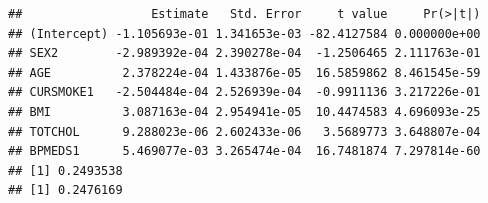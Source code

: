 \documentclass[ignorenonframetext,]{beamer}
\newenvironment{Shaded}{\begin{snugshade}}{\end{snugshade}}
\newcommand{\KeywordTok}[1]{\textcolor[rgb]{0.13,0.29,0.53}{\textbf{#1}}}
\newcommand{\DataTypeTok}[1]{\textcolor[rgb]{0.13,0.29,0.53}{#1}}
\newcommand{\DecValTok}[1]{\textcolor[rgb]{0.00,0.00,0.81}{#1}}
\newcommand{\StringTok}[1]{\textcolor[rgb]{0.31,0.60,0.02}{#1}}
\newcommand{\OperatorTok}[1]{\textcolor[rgb]{0.81,0.36,0.00}{\textbf{#1}}}
\newcommand{\NormalTok}[1]{#1}
\begin{document}
\begin{frame}[fragile]

\scriptsize

\begin{Shaded}
\end{Shaded}

\begin{verbatim}
##                  Estimate   Std. Error     t value     Pr(>|t|)
## (Intercept) -1.105693e-01 1.341653e-03 -82.4127584 0.000000e+00
## SEX2        -2.989392e-04 2.390278e-04  -1.2506465 2.111763e-01
## AGE          2.378224e-04 1.433876e-05  16.5859862 8.461545e-59
## CURSMOKE1   -2.504484e-04 2.526939e-04  -0.9911136 3.217226e-01
## BMI          3.087163e-04 2.954941e-05  10.4474583 4.696093e-25
## TOTCHOL      9.288023e-06 2.602433e-06   3.5689773 3.648807e-04
## BPMEDS1      5.469077e-03 3.265474e-04  16.7481874 7.297814e-60
## [1] 0.2493538
## [1] 0.2476169
\end{verbatim}

\end{frame}
\end{document}
